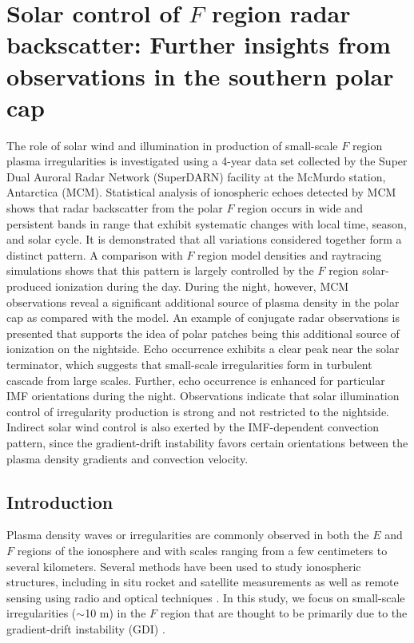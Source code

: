 
\chapter{Solar control of \(F\) region radar backscatter: Further insights from observations in the southern polar cap}


The role of solar wind and illumination in production of small-scale \(F\) region plasma irregularities is investigated using a 4-year data set collected by the Super Dual Auroral Radar Network (SuperDARN) facility at the McMurdo station, Antarctica (MCM). Statistical analysis of ionospheric echoes detected by MCM shows that radar backscatter from the polar \(F\) region occurs in wide and persistent bands in range that exhibit systematic changes with local time, season, and solar cycle. It is demonstrated that all variations considered together form a distinct pattern. A comparison with \(F\) region model densities and raytracing simulations shows that this pattern is largely controlled by the \(F\) region solar-produced ionization during the day. During the night, however, MCM observations reveal a significant additional source of plasma density in the polar cap as compared with the model. An example of conjugate radar observations is presented that supports the idea of polar patches being this additional source of ionization on the nightside. Echo occurrence exhibits a clear peak near the solar terminator, which suggests that small-scale irregularities form in turbulent cascade from large scales. Further, echo occurrence is enhanced for particular IMF orientations during the night. Observations indicate that solar illumination control of irregularity production is strong and not restricted to the nightside. Indirect solar wind control is also exerted by the IMF-dependent convection pattern, since the gradient-drift instability favors certain orientations between the plasma density gradients and convection velocity.


\section{Introduction}
\label{Sec:Intro}

Plasma density waves or irregularities are commonly observed in both the \(E\) and \(F\) regions of the ionosphere and with scales ranging from a few centimeters to several kilometers. Several methods have been used to study ionospheric structures, including in situ rocket and satellite measurements as well as remote sensing using radio and optical techniques \citep{Fejer1980}.  In this study, we focus on small-scale irregularities (\(\sim\)10 m) in the \(F\) region that are thought to be primarily due to the gradient-drift instability (GDI) \citep{Tsunoda1988}.


